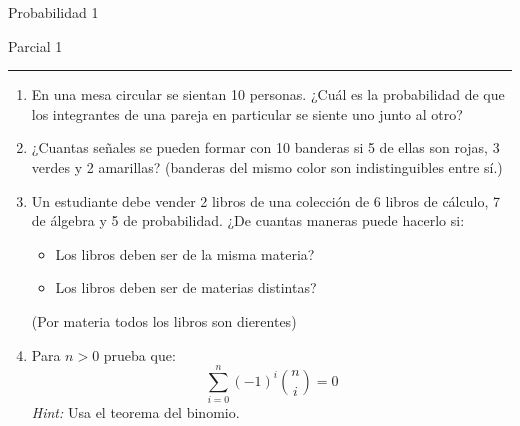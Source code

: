 \documentclass[12pt]{report}
\begin{document}
\pagestyle{empty}
\begin{center}
    \textsf{\Large Probabilidad 1}
    \par\medskip
    \textsf{\large Parcial 1}
\end{center}
\hrule
\par\bigskip

\begin{enumerate}
    \item En una mesa circular se sientan 10 personas. ¿Cuál es la probabilidad de que los integrantes de una pareja en particular se siente uno junto al otro?
    \item ¿Cuantas señales se pueden formar con 10 banderas si 5 de ellas son rojas, 3 verdes y 2 amarillas? (banderas del mismo color son indistinguibles entre sí.)
    \item Un estudiante debe vender 2 libros de una colección de 6 libros de cálculo, 7 de álgebra y 5 de probabilidad. ¿De cuantas maneras puede hacerlo si:
    \begin{itemize}
        \item Los libros deben ser de la misma materia?
        \item Los libros deben ser de materias distintas?
    \end{itemize}
    (Por materia todos los libros son dierentes)
    \item Para $n>0$ prueba que:
    $$
    \sum_{i=0}^n (-1)^i\binom{n}{i} = 0
    $$
    \emph{Hint:} Usa el teorema del binomio.
    
\end{enumerate}
\end{document}
